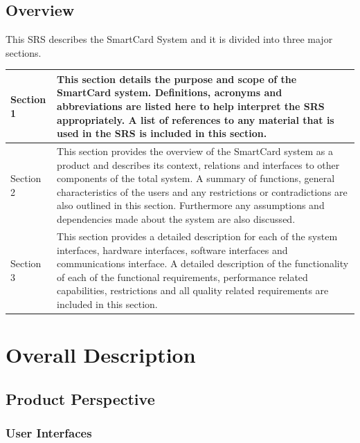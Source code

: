 \documentclass[english]{article}
\begin{document}
		\subsection{Overview}
				This SRS  describes the SmartCard System and it is divided into three major sections. \\ 
		
				\begin{tabular}{ |p{3cm}||p{11cm}|  }
				\hline
					Section 1 &  This section details the purpose and scope of the SmartCard system. Definitions, acronyms and abbreviations are listed here to help interpret the SRS appropriately. A list of references to any material that is used in the SRS is included in this section. 
					\\
				\hline
					Section 2 & This section provides the overview of the SmartCard system as a product and describes its context, relations and interfaces to other components of the total system. A summary of functions, general characteristics of the users and any restrictions or contradictions are also outlined in this section. Furthermore any assumptions and dependencies made about the system are also discussed.\\
					\hline
					Section 3 & This section provides a detailed description for each of the system interfaces, hardware interfaces, software interfaces and communications interface. A detailed description of the functionality of each of the functional requirements, performance related capabilities, restrictions and all quality related requirements are included in this section.\\
\hline
				\end{tabular}
	\newpage
	\section{Overall Description}
		
		\subsection{Product Perspective}
			


\subsubsection{User Interfaces}
				
\end{document}
